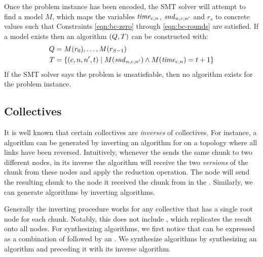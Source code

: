 Once the problem instance has been encoded, the SMT solver will attempt to find a model $M$, which maps the variables $\mathit{time}_{c,n}$, $\mathit{snd}_{n,c,n'}$ and $r_s$ to concrete values such that Constraints \ref{eqn:bc-zero} through \ref{eqn:bc-rounds} are satisfied. If a model exists then an algorithm $(Q, T)$ can be constructed with:
\begin{align*}
    Q&=M(r_0),\dotsc,M(r_{S-1}) \\
    T&=\{(c,n,n',t) \;|\; M(\mathit{snd}_{n,c,n'}) \wedge M(\mathit{time}_{c,n}) = t+1 \}
\end{align*}
If the SMT solver says the problem is unsatisfiable, then no algorithm exists for the problem instance.


\subsection{\reducingCap Collectives}
\label{sec:reduction}
It is well known that certain \reducing collectives are {\em inverses} of \broadcasting collectives. For instance, a \reduce algorithm can be generated by inverting an algorithm for \broadcast on a topology where all links have been reversed. Intuitively, whenever the \broadcast sends the same chunk to two different nodes, in its inverse the \reduce algorithm will receive the two {\em versions} of the chunk from these nodes and apply the reduction operation. The node will send the resulting chunk to the node it received the chunk from in the \broadcast. Similarly, we can generate \reducescatter algorithms by inverting \allgather algorithms. %

Generally the inverting procedure works for any \reducing collective that has a single root node for each chunk. Notably, this does not include \allreduce, which replicates the result onto all nodes. For synthesizing \allreduce algorithms, we first notice that \allreduce can be expressed as a combination of \reducescatter followed by an \allgather. We synthesize \allreduce algorithms by synthesizing an \allgather algorithm and preceding it with its inverse \reducescatter algorithm.

